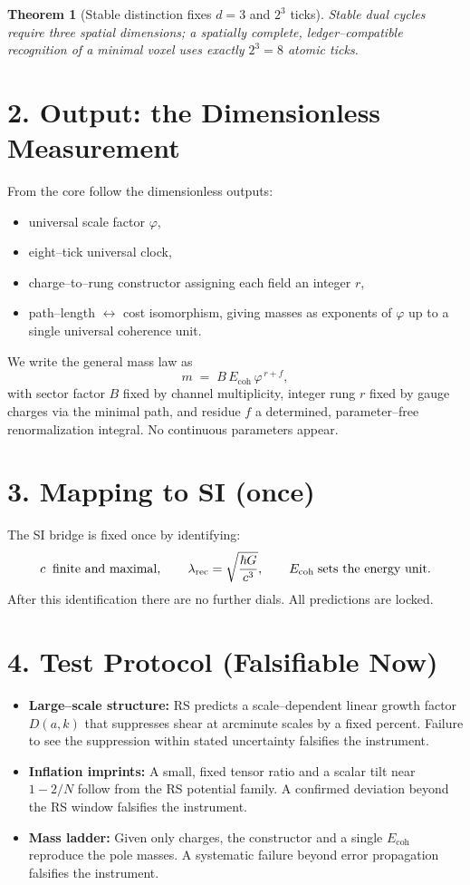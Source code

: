 \documentclass[11pt]{article}
\newtheorem{theorem}{Theorem}
\begin{document}
\begin{theorem}[Stable distinction fixes $d=3$ and $2^3$ ticks]
Stable dual cycles require three spatial dimensions; a spatially complete, ledger--compatible recognition of a minimal voxel uses exactly $2^{3}=8$ atomic ticks.
\end{theorem}

\section*{2. Output: the Dimensionless Measurement}
From the core follow the dimensionless outputs:
\begin{itemize}
  \item universal scale factor $\varphi$,
  \item eight--tick universal clock,
  \item charge--to--rung constructor assigning each field an integer $r$,
  \item path--length $\leftrightarrow$ cost isomorphism, giving masses as exponents of $\varphi$ up to a single universal coherence unit.
\end{itemize}
We write the general mass law as
\[
m \;=\; B\,E_{\mathrm{coh}}\,\varphi^{\,r+f},
\]
with sector factor $B$ fixed by channel multiplicity, integer rung $r$ fixed by gauge charges via the minimal path, and residue $f$ a determined, parameter--free renormalization integral. No continuous parameters appear.

\section*{3. Mapping to SI (once)}
The SI bridge is fixed once by identifying:
\[
c \;\; {\rm finite\ and\ maximal},\qquad
\lambda_{\rm rec}=\sqrt{\frac{\hbar G}{c^3}},\qquad
E_{\mathrm{coh}} \;{\rm sets\ the\ energy\ unit}.
\]
After this identification there are no further dials. All predictions are locked.

\section*{4. Test Protocol (Falsifiable Now)}
\begin{itemize}
  \item \textbf{Large--scale structure:} RS predicts a scale--dependent linear growth factor $D(a,k)$ that suppresses shear at arcminute scales by a fixed percent. Failure to see the suppression within stated uncertainty falsifies the instrument.
  \item \textbf{Inflation imprints:} A small, fixed tensor ratio and a scalar tilt near $1-2/N$ follow from the RS potential family. A confirmed deviation beyond the RS window falsifies the instrument.
  \item \textbf{Mass ladder:} Given only charges, the constructor and a single $E_{\mathrm{coh}}$ reproduce the pole masses. A systematic failure beyond error propagation falsifies the instrument.
\end{itemize}
\end{document}

